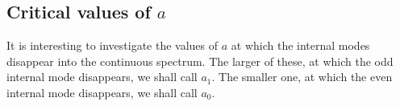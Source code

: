 
\subsection{Critical values of $a$}

It is interesting to investigate the values of $a$ at which the internal modes disappear into the continuous spectrum. The larger of these, at which the odd internal mode disappears, we shall call $a_1$. The smaller one, at which the even internal mode disappears, we shall call $a_0$. %





